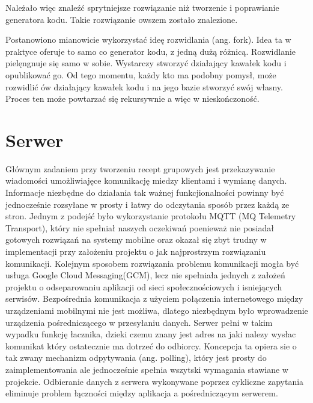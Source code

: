 \documentclass[11pt,a4paper,polish,thesis]{dcsbook}
\begin{document}
Należało więc znaleźć sprytniejsze rozwiązanie niż tworzenie i poprawianie generatora kodu. Takie rozwiązanie owszem zostało znalezione.

Postanowiono mianowicie wykorzystać ideę rozwidlania (ang. fork). Idea ta w praktyce oferuje to samo co generator kodu, z jedną dużą różnicą. Rozwidlanie pielęngnuje
się samo w sobie. Wystarczy stworzyć działający kawałek kodu i opublikować go. Od tego momentu, każdy kto ma podobny pomysł, może rozwidlić ów działający kawałek kodu
i na jego bazie stworzyć swój własny. Proces ten może powtarzać się rekursywnie a więc w nieskończoność.
\section{Serwer}


Głównym zadaniem przy tworzeniu recept grupowych jest przekazywanie wiadomości umożliwiajęce komunikację miedzy klientami i wymianę danych. 
Informacje niezbędne do działania tak ważnej funkcjionalności powinny być jednocześnie rozsyłane w prosty i łatwy do odczytania sposób przez każdą ze stron.
Jednym z podejść było wykorzystanie protokołu MQTT (MQ Telemetry Transport), który nie spełniał naszych oczekiwań poenieważ nie posiadał gotowych rozwiązań na systemy mobilne oraz okazał się zbyt trudny w implementacji przy założeniu projektu o jak najprostrzym rozwiązaniu komunikacji.
Kolejnym sposobem rozwiązania problemu komunikacji mogła być usługa Google Cloud Messaging(GCM), lecz nie spełniała jednych z założeń projektu o odseparowaniu aplikacji od sieci społecznościowych i isniejących serwisów.
Bezpośrednia komunikacja z użyciem połączenia internetowego między urządzeniami mobilnymi nie jest możliwa, dlatego niezbędnym było wprowadzenie urządzenia pośredniczącego w przesyłaniu danych. 
Serwer pełni w takim wypadku funkcję łacznika, dzieki czemu znany jest adres na jaki nalezy wysłac komunikat który ostatecznie ma dotrzeć do odbiorcy. 
Koncepcja ta opiera sie o tak zwany mechanizm odpytywania (ang. polling), który jest prosty do zaimplementowania ale jednocześnie spełnia wszytski wymagania stawiane w projekcie.
Odbieranie danych z serwera wykonywane poprzez cykliczne zapytania eliminuje problem łączności między aplikacja a pośredniczącym serwerem.
\end{document}
